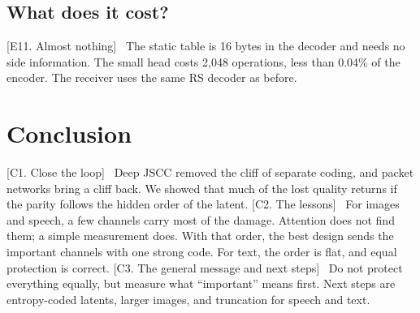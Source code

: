 \documentclass[journal]{IEEEtran}
\newcommand{\beat}[1]{\noindent\textcolor{blue!60!black}{\textsf{\footnotesize [#1]}}\ }
\begin{document}
\subsection{What does it cost?}
\beat{E11. Almost nothing}
The static table is 16 bytes in the decoder and needs no side information. The small head costs 2,048
operations, less than 0.04\% of the encoder. The receiver uses the same RS decoder as before.

\section{Conclusion}\label{sec:conclusion}
\beat{C1. Close the loop}
Deep JSCC removed the cliff of separate coding, and packet networks bring a cliff back. We showed that
much of the lost quality returns if the parity follows the hidden order of the latent.
\beat{C2. The lessons}
For images and speech, a few channels carry most of the damage. Attention does not find them; a simple
measurement does. With that order, the best design sends the important channels with one strong code.
For text, the order is flat, and equal protection is correct.
\beat{C3. The general message and next steps}
Do not protect everything equally, but measure what ``important'' means first. Next steps are
entropy-coded latents, larger images, and truncation for speech and text.



\end{document}
